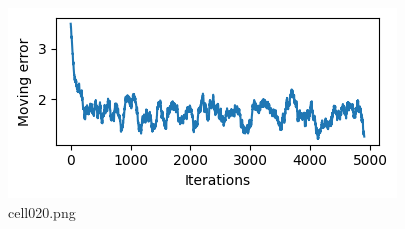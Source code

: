 \begin{figure}[ht]
	\centering
	\includegraphics[scale=0.8, max width=\linewidth]{./fig/energy-based-model/predictive-coding/cell020.png}
	\caption{cell020.png}
	\label{cell020.png}
\end{figure}